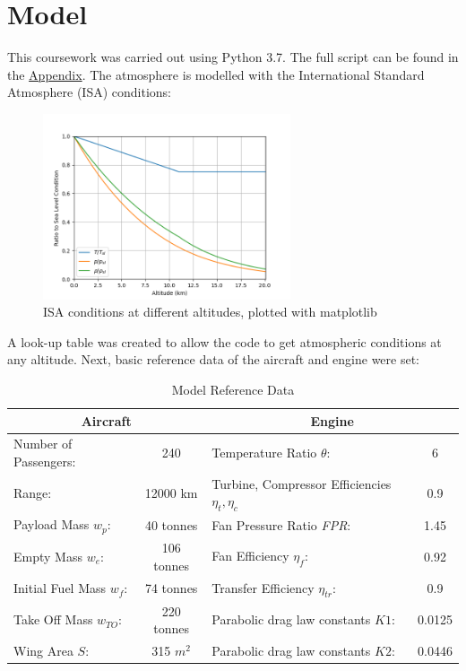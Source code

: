 \documentclass[12pt, a4paper]{article}
\begin{document}
\section{Model}
This coursework was carried out using Python 3.7. The full script can be found in the \hyperref[sec:Appendix]{Appendix}. The atmosphere is modelled with the International Standard Atmosphere (ISA) conditions:
\begin{figure}[H]
	\centering
	\includegraphics[width=0.65\textwidth]{../Plots/ISA}
	\caption{ISA conditions at different altitudes, plotted with matplotlib}
	\label{fig:isa}
\end{figure} 
A look-up table was created to allow the code to get atmospheric conditions at any altitude. Next, basic reference data of the aircraft and engine were set:
\begin{table}[h]
	\centering
	\caption{Model Reference Data}
	\label{tab:ref}
	\begin{tabular}{|l|c|l|c|}
		\hline
		\multicolumn{2}{|c|}{\textbf{Aircraft}} & \multicolumn{2}{c|}{\textbf{Engine}} \\ \hline
		Number of Passengers: & 240 & Temperature Ratio $\theta$: &  6 \\ \hline
		Range: & 12000 km & Turbine, Compressor Efficiencies $\eta_t,\eta_c$ & 0.9 \\ \hline
		Payload Mass $w_p$: & 40 tonnes & Fan Pressure Ratio \textit{FPR}: & 1.45 \\ \hline
		Empty Mass $w_e$: & 106 tonnes & Fan Efficiency $\eta_f$: & 0.92 \\ \hline
		Initial Fuel Mass $ w_f $: & 74 tonnes & Transfer Efficiency $\eta_{tr}$: & 0.9 \\ \hline
		Take Off Mass $ w_{TO} $: & 220 tonnes & Parabolic drag law constants $ K1 $: & 0.0125\\ \hline
		Wing Area $S$: & 315 $m^2$ &  Parabolic drag law constants $ K2 $: & 0.0446 \\ \hline
	\end{tabular}
\end{table}
\end{document}
